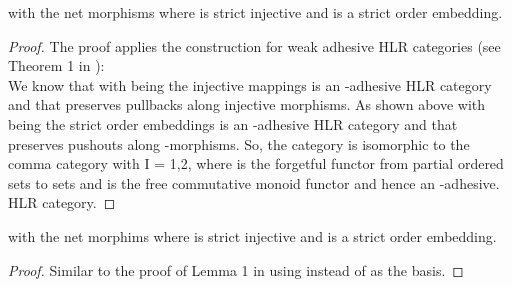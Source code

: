 \begin{lemma}
  \label{l.madHLr_PTp}
	 with  the net morphisms where  is strict injective and 
	is a strict order embedding. 
  \end{lemma}
	
	\begin{proof}
The proof applies the construction for weak adhesive HLR categories (see Theorem 1 in \cite{PEL08}):\\
	 We know that    with  being the injective mappings is an -adhesive
HLR category and that  preserves pullbacks along injective morphisms.
 As shown above   with  being the strict order embeddings is an -adhesive  
HLR category and that  preserves pushouts along -morphisms.
So, the category  is isomorphic to the comma category  with I = {1,2}, where  is the forgetful functor from partial ordered sets to sets and  is the free commutative
monoid functor and hence  an -adhesive.  
HLR category.
	\end{proof}


\begin{lemma}
  \label{l.madHLr_PTp}
	 with  the net morphims where  is strict injective and 
	is a strict order embedding. 
  \end{lemma}
	\begin{proof}
	Similar to the proof of Lemma 1 in \cite{Pad12} using  instead of  as the basis.\end{proof}